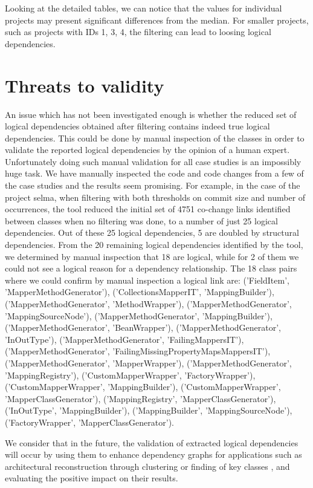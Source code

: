 \documentclass[a4paper,twoside]{article}
\begin{document}
Looking at the detailed tables, we can notice that the values for individual projects may present significant differences from the median. For smaller projects, such as projects with IDs 1, 3, 4, the filtering can lead to loosing logical dependencies.  


\section {Threats to validity}
\label{sec:validity}


An issue which has not been investigated enough is whether the reduced set of logical dependencies obtained after filtering contains indeed true logical dependencies. This could be done by manual inspection of the classes in order to validate the reported logical dependencies by the opinion of a human expert. Unfortunately doing such manual validation for all case studies is an impossibly huge task. We have manually inspected the code and code changes from a few of the case studies and the results seem promising. For example, in the case of the project selma, when filtering with both thresholds on commit size and number of occurrences, the tool reduced the initial set of 4751 co-change links identified between classes when no filtering was done, to a number of just 25 logical dependencies. Out of these 25 logical dependencies, 5 are doubled by structural dependencies. From the 20 remaining logical dependencies identified by the tool, we determined by manual inspection that 18 are logical, while for 2 of them we could not see a logical reason for a dependency relationship. 
The 18 class pairs where we could confirm by manual inspection a logical link are: ('FieldItem', 'MapperMethodGenerator'),  ('CollectionsMapperIT', 'MappingBuilder'), ('MapperMethodGenerator', 'MethodWrapper'), ('MapperMethodGenerator', 'MappingSourceNode'),  ('MapperMethodGenerator', 'MappingBuilder'), ('MapperMethodGenerator', 'BeanWrapper'), ('MapperMethodGenerator', 'InOutType'), ('MapperMethodGenerator', 'FailingMappersIT'),  ('MapperMethodGenerator', 'FailingMissingPropertyMapsMappersIT'), ('MapperMethodGenerator', 'MapperWrapper'), ('MapperMethodGenerator', 'MappingRegistry'),  ('CustomMapperWrapper', 'FactoryWrapper'),  ('CustomMapperWrapper', 'MappingBuilder'),  ('CustomMapperWrapper', 'MapperClassGenerator'), ('MappingRegistry', 'MapperClassGenerator'), ('InOutType', 'MappingBuilder'),  ('MappingBuilder', 'MappingSourceNode'),  ('FactoryWrapper', 'MapperClassGenerator').

We consider that in the future, the validation of extracted logical dependencies will occur by using them to enhance dependency graphs for  applications such as architectural reconstruction through clustering \cite{SoraConti} or finding of key classes \cite{PagerankENASE}, and evaluating the positive impact on their results.   
\end{document}

